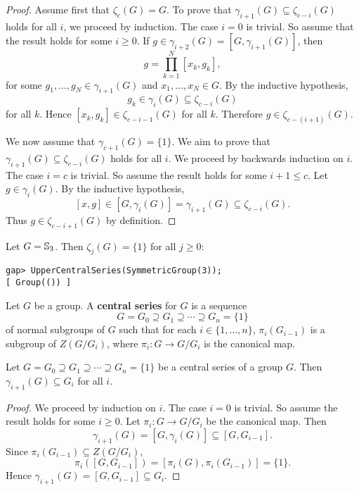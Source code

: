 \begin{proof}
Assume first that $\zeta_c(G)=G$. To prove that 
$\gamma_{i+1}(G)\subseteq\zeta_{c-i}(G)$ holds for all $i$, we proceed by induction. 
The case $i=0$ is trivial. So assume that the result holds for some $i\geq0$. If
$g\in\gamma_{i+2}(G)=[G,\gamma_{i+1}(G)]$, then     
\[
g=\prod_{k=1}^N [x_k,g_k],
\]
for some $g_1,\dots,g_N\in\gamma_{i+1}(G)$ and $x_1,\dots,x_N\in G$. By the inductive 
hypothesis, 
	\[
	g_k\in\gamma_i(G)\subseteq\zeta_{c-i}(G)
	\]
for all $k$. Hence $[x_k,g_k]\in\zeta_{c-i-1}(G)$ for all $k$. Therefore   
$g\in\zeta_{c-(i+1)}(G)$. 
	
We now assume that $\gamma_{c+1}(G)=\{1\}$. We aim to prove that 
$\gamma_{i+1}(G)\subseteq\zeta_{c-i}(G)$ holds for all $i$. We proceed by backwards induction on $i$. 
The case $i=c$ is trivial. So assume the result holds for some $i+1\leq c$. 
Let $g\in\gamma_{i}(G)$. By the inductive hypothesis, 
	\[
	[x,g]\in [G,\gamma_i(G)]=\gamma_{i+1}(G)\subseteq\zeta_{c-i}(G).
	\]
Thus $g\in\zeta_{c-i+1}(G)$ by definition. 
\end{proof}

\begin{example}
Let $G=\mathbb{S}_3$. Then $\zeta_j(G)=\{1\}$ for all $j\geq 0$: 
\begin{lstlisting}
gap> UpperCentralSeries(SymmetricGroup(3));
[ Group(()) ]
\end{lstlisting}
\end{example}

\begin{definition}
Let $G$ be a group. A \textbf{central series} for $G$ 
is a sequence 
	\[
		G=G_0\supseteq G_1\supseteq\cdots\supseteq G_n=\{1\}
	\]
of normal subgroups of $G$ such that 
for each $i\in\{1,\dots,n\}$, 
$\pi_i(G_{i-1})$ is a subgroup of $Z(G/G_i)$, where  $\pi_i\colon G\to
G/G_i$ is the canonical map.
\end{definition}

\begin{lemma}
\label{lem:central_series}
Let $G=G_0\supseteq G_1\supseteq\cdots\supseteq G_n=\{1\}$ be 
a central series of a group $G$. Then $\gamma_{i+1}(G)\subseteq G_i$ for all $i$.
\end{lemma}

\begin{proof}
We proceed by induction on $i$. The case $i=0$ is trivial. So assume the result holds for some
$i\geq0$. Let  
	$\pi_i\colon G\to
	G/G_i$ be the canonical map. 
	Then  
	\[
	\gamma_{i+1}(G)=[G,\gamma_i(G)]\subseteq [G,G_{i-1}].
	\]
	Since $\pi_i(G_{i-1})\subseteq Z(G/G_{i})$, 
	\[
        \pi_i([G,G_{i-1}])=[\pi_i(G),\pi_i(G_{i-1})]=\{1\}.
        \]
        Hence $\gamma_{i+1}(G)=[G,G_{i-1}]\subseteq G_i$. 
\end{proof}

